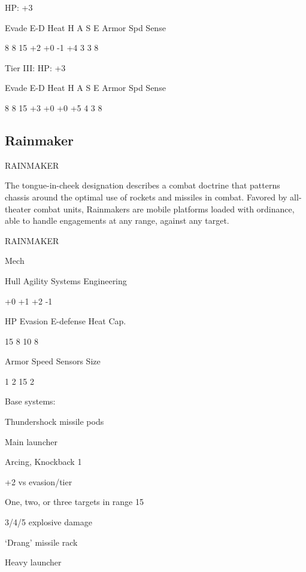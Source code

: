 HP: +3
 

          Evade    E-D    Heat    H     A    S     E       Armor        Spd      Sense 

          8        8      15      +2    +0   -1    +4       3           3         8 

Tier III:  
HP: +3
 

          Evade    E-D    Heat    H     A    S     E       Armor        Spd      Sense 

          8        8      15      +3    +0   +0    +5       4           3         8 

                                                                                                               
\subsection{Rainmaker}

                                             RAINMAKER  

The tongue-in-cheek designation describes a combat doctrine that patterns chassis around the  
optimal use of rockets and missiles in combat. Favored by all-theater combat units, Rainmakers  
are mobile platforms loaded with ordinance, able to handle engagements at any range, against  
any target. 
 

       RAINMAKER 

       Mech 

       Hull       Agility     Systems       Engineering 

       +0         +1          +2            -1 

       HP         Evasion     E-defense     Heat Cap. 

       15         8           10            8 

       Armor      Speed       Sensors       Size 

       1          2           15            2 

Base systems:
 
Thundershock missile pods
 
Main launcher
 
Arcing, Knockback 1
 
+2 vs evasion/tier
 
One, two, or three targets in range 15
 
3/4/5 explosive damage
 

‘Drang’ missile rack
 
Heavy launcher
 
